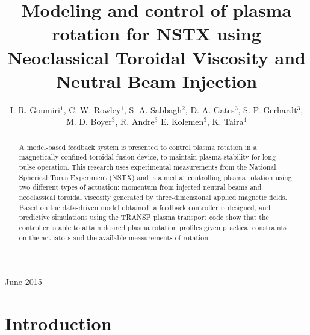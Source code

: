 \documentclass[12pt]{iopart}
\begin{document}
\title[Modeling and control of plasma rotation using NTV and NBI]{Modeling and control of plasma rotation for NSTX using Neoclassical Toroidal Viscosity and Neutral Beam Injection}

\author{I. R. Goumiri$^1$, C. W. Rowley$^1$, S. A. Sabbagh$^2$, D. A. Gates$^3$, S. P. Gerhardt$^3$, M. D. Boyer$^3$, R. Andre$^3$  E. Kolemen$^3$, K. Taira$^4$ }

\address{$^1$ Department of Mechanical and Aerospace Engineering, Princeton University, Princeton, NJ 08544, USA}
\address{$^2$ Department of Applied Physics and Applied Mathematics, Columbia University, New York, NY 10027, USA}
\address{$^3$ Princeton Plasma Physics Laboratory, Princeton, NJ 08544, USA}
\address{$^4$ Florida Center for Advanced Aero-Propulsion, Florida State University, Tallahassee, Florida 32310, USA}

\vspace{10pt}
\begin{indented}
\item[]June 2015
\end{indented}

\begin{abstract}
A model-based feedback system is presented to control plasma rotation in a
magnetically confined toroidal fusion device, to maintain plasma stability for
long-pulse operation.
%
This research uses experimental measurements from the National Spherical Torus
Experiment (NSTX) and is aimed at controlling plasma rotation using two
different types of actuation: momentum
from injected neutral beams and neoclassical toroidal viscosity generated by
three-dimensional applied magnetic fields.
%
Based on the data-driven model obtained, a feedback controller is designed, and
predictive simulations using the TRANSP plasma transport code show that the
controller is able to attain desired plasma rotation profiles given practical
constraints on the actuators and the available measurements of rotation.
\end{abstract}

\ioptwocol


\section{Introduction}
\end{document}
